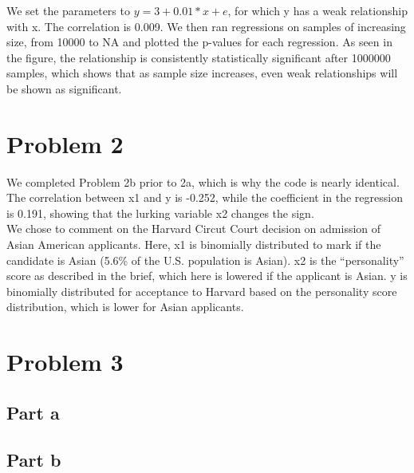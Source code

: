 \documentclass{article}\usepackage[]{graphicx}\usepackage[]{color}
\begin{document}
\noindent We set the parameters to $y = 3 + 0.01*x + e$, for which y has a weak relationship with x.  The correlation is 0.009. We then ran regressions on samples of increasing size, from 10000 to NA and plotted the p-values for each regression.  As seen in the figure, the relationship is consistently statistically significant after 1000000 samples, which shows that as sample size increases, even weak relationships will be shown as significant.


\section*{Problem 2}


\noindent We completed Problem 2b prior to 2a, which is why the code is nearly identical. The correlation between x1 and y is -0.252, while the coefficient in the regression is 0.191, showing that the lurking variable x2 changes the sign.\\



\noindent We chose to comment on the Harvard Circut Court decision on admission of Asian American applicants.  Here, x1 is binomially distributed to mark if the candidate is Asian (5.6\% of the U.S. population is Asian).  x2 is the ``personality'' score as described in the brief, which here is lowered if the applicant is Asian. y is binomially distributed for acceptance to Harvard based on the personality score distribution, which is lower for Asian applicants.  

\section*{Problem 3}
\subsection*{Part a}
\begin{figure}[h!]
\end{figure}

\subsection*{Part b}


\end{document}
